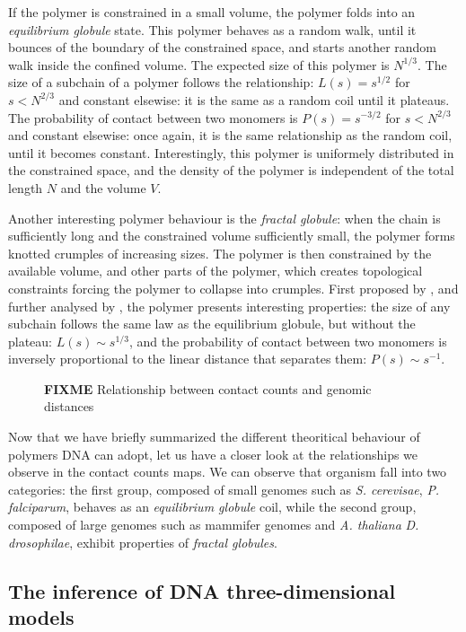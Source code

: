 If the polymer is constrained in a small volume, the polymer folds into an
\textit{equilibrium globule} state. This polymer behaves as a random walk,
until it bounces of the boundary of the constrained space, and starts another
random walk inside the confined volume. The expected size of this polymer is
$N^{1/3}$. The size of a subchain of a polymer follows the relationship: $L(s) =
s^{1/2}$ for $s < N^{2/3}$ and constant elsewise: it is the same as a random
coil until it plateaus. The probability of contact between two monomers is
$P(s) = s^{-3/2}$ for $s < N^{2/3}$ and constant elsewise: once again, it is
the same relationship as the random coil, until it becomes constant.
Interestingly, this polymer is uniformely distributed in the constrained
space, and the density of the polymer is independent of the total length $N$
and the volume $V$.

Another interesting polymer behaviour is the \textit{fractal globule}: when
the chain is sufficiently long and the constrained volume sufficiently small,
the polymer forms knotted crumples of increasing sizes. The polymer is then
constrained by the available volume, and other parts of the polymer, which
creates topological constraints forcing the polymer to collapse into crumples.
First proposed by \citet{grosberg:role}, and further analysed by
\citet{mirny:fractal}, the polymer presents interesting properties: the size
of any subchain follows the same law as the equilibrium globule, but without
the plateau: $L(s) \sim s^{1/3}$, and the probability of contact between two
monomers is inversely proportional to the linear distance that separates them:
$P(s) \sim s^{-1}$.


\begin{figure}
\caption{{\bf FIXME} Relationship between contact counts and genomic distances}
\label{fig:hic_relationships}
\end{figure}

Now that we have briefly summarized the different theoritical behaviour of
polymers DNA can adopt, let us have a closer look at the relationships we
observe in the contact counts maps. We can observe that organism fall into two
categories: the first group, composed of small genomes such as \textit{S.
cerevisae}, \textit{P. falciparum}, behaves as an \textit{equilibrium globule}
coil, while the second group, composed of large genomes such as mammifer
genomes and \textit{A. thaliana} \textit{D. drosophilae}, exhibit properties
of \textit{fractal globules}.

\subsection{The inference of DNA three-dimensional models}


